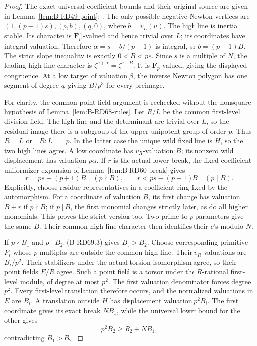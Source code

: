 \begin{proof}
The exact universal coefficient bounds and their original source
are given in Lemma~\ref{lem:B-RD49-point}:
\cite[Proposition~5.7; equations (12.3)--(12.5);
Proposition~12.10 and proof]{HopkinsGross1994Bundles}.
The only possible negative Newton vertices are
\((1,(p-1)s),(p,b),(q,0)\), where \(b=v_L(u)\).
The high line is inertia stable. Its character is
\(\mathbf F_p^\times\)-valued and hence trivial over \(L\);
its coordinates have integral valuation. Therefore
\(\alpha=s-b/(p-1)\) is integral, so \(b=(p-1)B\).
The strict slope inequality is exactly \(0<B<pe\).
Since \(s\) is a multiple of \(N\), the leading high-line
character is \(\zeta^{c+\alpha}=\zeta^{c-B}\).
It is \(\mathbf F_p\)-valued, giving the displayed congruence.
At a low target of valuation \(\beta\), the inverse Newton polygon
has one segment of degree \(q\), giving \(B/p^3\) for every
preimage.

For clarity, the common-point-field argument is rechecked without
the nonsquare hypothesis of Lemma~\ref{lem:B-RD68-rules}.
Let \(R/L\) be the common first-level division field. The high
line and the determinant are trivial over \(L\), so the residual
image there is a subgroup of the upper unipotent group of order
\(p\). Thus \(R=L\) or \([R:L]=p\).
In the latter case the unique wild fixed line is \(H\), so the
two high lines agree. A low coordinate has \(v_R\)-valuation
\(B\); its nonzero wild displacement has valuation \(p\alpha\).
If \(r\) is the actual lower break, the fixed-coefficient
uniformizer expansion of Lemma~\ref{lem:B-RD60-break} gives
\[
 r=ps-(p+1)B \quad(p\nmid B),\qquad
 r<ps-(p+1)B \quad(p\mid B).
 \tag{B-RD69.3}
\]
Explicitly, choose residue representatives in a coefficient
ring fixed by the automorphism. For a coordinate of valuation
\(B\), its first change has valuation \(B+r\) if \(p\nmid B\);
if \(p\mid B\), the first monomial changes strictly later,
as do all higher monomials. This proves the strict version too.
Two prime-to-\(p\) parameters give the same \(B\). Their common
high-line character then identifies their \(c\)'s modulo \(N\).

If \(p\nmid B_1\) and \(p\mid B_2\), (B-RD69.3) gives
\(B_1>B_2\). Choose corresponding primitive \(P_i\) whose
\(p\)-multiples are outside the common high line. Their
\(v_R\)-valuations are \(B_i/p^2\). Their stabilizers under
the actual torsion isomorphism agree, so their point fields
\(E/R\) agree. Such a point field is a torsor under the
\(R\)-rational first-level module, of degree at most \(p^2\).
The first valuation denominator forces degree \(p^2\).
Every first-level translation therefore occurs, and the
normalized valuations in \(E\) are \(B_i\).
A translation outside \(H\) has displacement valuation \(p^2B_i\).
The first coordinate gives its exact break \(NB_1\), while
the universal lower bound for the other gives
\[
 p^2B_2\ge B_2+NB_1,
 \tag{B-RD69.4}
\]
contradicting \(B_1>B_2\).


\end{proof}
